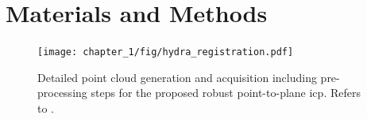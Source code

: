 

\section{Materials and Methods}
\label{c1:sec:materials_and_methods}
\begin{figure}[htb]
    \centering
    \texttt{[image: chapter\_1/fig/hydra\_registration.pdf]}
    \caption{Detailed point cloud generation and acquisition including pre-processing steps for the proposed robust point-to-plane \acrshort{icp}. Refers to .}
    \label{c1:fig:hydra_registration}
\end{figure}

